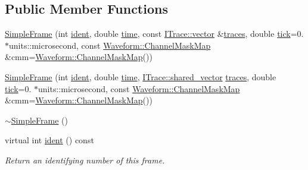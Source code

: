 \subsection*{Public Member Functions}
\begin{DoxyCompactItemize}
\item 
\hyperlink{class_wire_cell_1_1_simple_frame_aae6b1f1cf7b2f1fcd5f57608366eb862}{Simple\+Frame} (int \hyperlink{class_wire_cell_1_1_simple_frame_a66da8e8ce7a801019b6457ebd2381f6c}{ident}, double \hyperlink{class_wire_cell_1_1_simple_frame_a992d807e8f20c9481deb419496b9de91}{time}, const \hyperlink{class_wire_cell_1_1_i_data_ae1a9f863380499bb43f39fabb6276660}{I\+Trace\+::vector} \&\hyperlink{class_wire_cell_1_1_simple_frame_aec2f4f732121b801887077c874cb8b98}{traces}, double \hyperlink{class_wire_cell_1_1_simple_frame_a14d84465625254f1b0086cef1d0bb5cd}{tick}=0. $\ast$units\+::microsecond, const \hyperlink{namespace_wire_cell_1_1_waveform_a18b9ae61c858e340252ba3ac83ac3bc0}{Waveform\+::\+Channel\+Mask\+Map} \&cmm=\hyperlink{namespace_wire_cell_1_1_waveform_a18b9ae61c858e340252ba3ac83ac3bc0}{Waveform\+::\+Channel\+Mask\+Map}())
\item 
\hyperlink{class_wire_cell_1_1_simple_frame_ac4d4421a7c4f8a129bb2712345073d51}{Simple\+Frame} (int \hyperlink{class_wire_cell_1_1_simple_frame_a66da8e8ce7a801019b6457ebd2381f6c}{ident}, double \hyperlink{class_wire_cell_1_1_simple_frame_a992d807e8f20c9481deb419496b9de91}{time}, \hyperlink{class_wire_cell_1_1_i_data_a6edac35e7dd886018740993b28c7ca1e}{I\+Trace\+::shared\+\_\+vector} \hyperlink{class_wire_cell_1_1_simple_frame_aec2f4f732121b801887077c874cb8b98}{traces}, double \hyperlink{class_wire_cell_1_1_simple_frame_a14d84465625254f1b0086cef1d0bb5cd}{tick}=0. $\ast$units\+::microsecond, const \hyperlink{namespace_wire_cell_1_1_waveform_a18b9ae61c858e340252ba3ac83ac3bc0}{Waveform\+::\+Channel\+Mask\+Map} \&cmm=\hyperlink{namespace_wire_cell_1_1_waveform_a18b9ae61c858e340252ba3ac83ac3bc0}{Waveform\+::\+Channel\+Mask\+Map}())
\item 
\hyperlink{class_wire_cell_1_1_simple_frame_ad40f9232148c703316df79058cf9ea24}{$\sim$\+Simple\+Frame} ()
\item 
virtual int \hyperlink{class_wire_cell_1_1_simple_frame_a66da8e8ce7a801019b6457ebd2381f6c}{ident} () const
\begin{DoxyCompactList}\small\item\em Return an identifying number of this frame. \end{DoxyCompactList}\item 

\end{DoxyCompactItemize}
